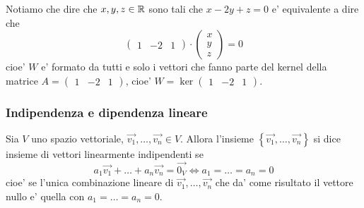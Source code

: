 \begin{example}
    Notiamo che dire che $x, y, z \in \mathbb{R}$ sono tali che $x-2y+z = 0$ e' equivalente a dire che \[
        \begin{pmatrix}
            1 &-2 &1
        \end{pmatrix} \cdot \begin{pmatrix}
            x \\ y \\ z
        \end{pmatrix} = 0
    \]
    cioe' $W$ e' formato da tutti e solo i vettori che fanno parte del kernel della matrice $A = \begin{pmatrix} 1 &-2 &1 \end{pmatrix}$, cioe' $W = \ker \begin{pmatrix} 1 &-2 &1 \end{pmatrix}$.
\end{example}

\subsubsection{Indipendenza e dipendenza lineare}

\begin{definition}
    Sia $V$ uno spazio vettoriale, $\vec{v_1}, \dots, \vec{v_n} \in V$. Allora l'insieme $\left\{ \vec{v_1}, \dots, \vec{v_n} \right\}$ si dice insieme di vettori linearmente indipendenti se
    \begin{equation}
        a_1\vec{v_1} + \dots + a_n\vec{v_n} = \vec{0_V} \iff a_1 = \dots = a_n = 0
    \end{equation}
    cioe' se l'unica combinazione lineare di $\vec{v_1}, \dots, \vec{v_n}$ che da' come risultato il vettore nullo e' quella con $a_1 = \dots = a_n = 0$.
\end{definition}

